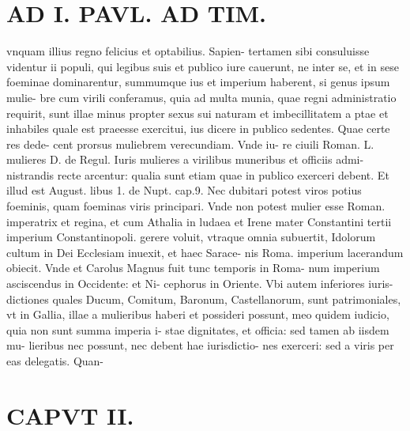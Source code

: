 \documentclass{article}
\begin{document}
\begin{pages}
\section*{AD I. PAVL. AD TIM. }
\marginpar{[ p.86 ]}\pstart vnquam illius regno felicius et optabilius. Sapien- tertamen sibi consuluisse videntur ii populi, qui legibus suis et publico iure cauerunt, ne inter se, et in sese foeminae dominarentur, summumque ius et imperium haberent, si genus ipsum mulie- bre cum virili conferamus, quia ad multa munia, quae regni administratio requirit, sunt illae minus propter sexus sui naturam et imbecillitatem a ptae et inhabiles quale est praeesse exercitui, ius dicere in publico sedentes. Quae certe res dede- cent prorsus muliebrem verecundiam. Vnde iu- re ciuili Roman. L. mulieres D. de Regul. Iuris mulieres a virilibus muneribus et officiis admi- nistrandis recte arcentur: qualia sunt etiam quae in publico exerceri debent. Et illud est August. libus 1. de Nupt. cap.9. Nec dubitari potest viros potius foeminis, quam foeminas viris principari. Vnde non potest mulier esse Roman. imperatrix et regina, et cum Athalia in ludaea et Irene mater Constantini tertii imperium Constantinopoli. gerere voluit, vtraque omnia subuertit, Idolorum cultum in Dei Ecclesiam inuexit, et haec Sarace- nis Roma. imperium lacerandum obiecit. Vnde et Carolus Magnus fuit tunc temporis in Roma- num imperium asciscendus in Occidente: et Ni- cephorus in Oriente. Vbi autem inferiores iuris- dictiones quales Ducum, Comitum, Baronum, Castellanorum, sunt patrimoniales, vt in Gallia, illae a mulieribus haberi et possideri possunt, meo quidem iudicio, quia non sunt summa imperia i- stae dignitates, et officia: sed tamen ab iisdem mu- lieribus nec possunt, nec debent hae iurisdictio- nes exerceri: sed a viris per eas delegatis. Quan-  \pend
\section*{CAPVT  II. }
\marginpar{[ p.87 ]}\pstart {}
{}

\end{pages}
\end{document}
